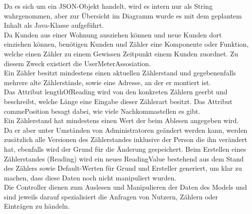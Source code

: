 Da es sich um ein JSON-Objekt handelt, wird es intern nur als String wahrgenommen, aber zur Übersicht im Diagramm wurde es mit dem geplantem Inhalt als Java-Klasse aufgeführt.\\
Da Kunden aus einer Wohnung ausziehen können und neue Kunden dort einziehen können, benötigen Kunden und Zähler eine Komponente oder Funktion, welche einen Zähler zu einem Gewissen Zeitpunkt einem Kunden zuordnet. 
Zu diesem Zweck existiert die UserMeterAssosiation.\\
Ein Zähler besitzt mindestens einen aktuellen Zählerstand und gegebenenfalls mehrere alte Zählerstände, sowie eine Adresse, an der er montiert ist.\\
Das Attribut lengthOfReading wird von den konkreten Zählern geerbt und beschreibt, welche Länge eine Eingabe dieser Zählerart besitzt. Das Attribut commePosition besagt dabei, wie viele Nachkommastellen es gibt.\\
Ein Zählerstand hat mindestens einen Wert der beim Ablesen angegeben wird. 
Da er aber unter Umständen von Administratoren geändert werden kann, werden zusätzlich alle Versionen des Zählerstandes inklusive der Person die ihn verändert hat, ebenfalls wird der Grund für die Änderung gespeichert.
Beim Erstellen eines Zählerstandes (Reading) wird ein neues ReadingValue bestehend aus dem Stand des Zählers sowie Default-Werten für Grund und Ersteller generiert, um klar zu machen, dass diese Daten noch nicht manipuliert wurden.\\
Die Controller dienen zum Auslesen und Manipulieren der Daten des Models und sind jeweils darauf spezialisiert die Anfragen von Nutzern, Zählern oder Einträgen zu händeln.


